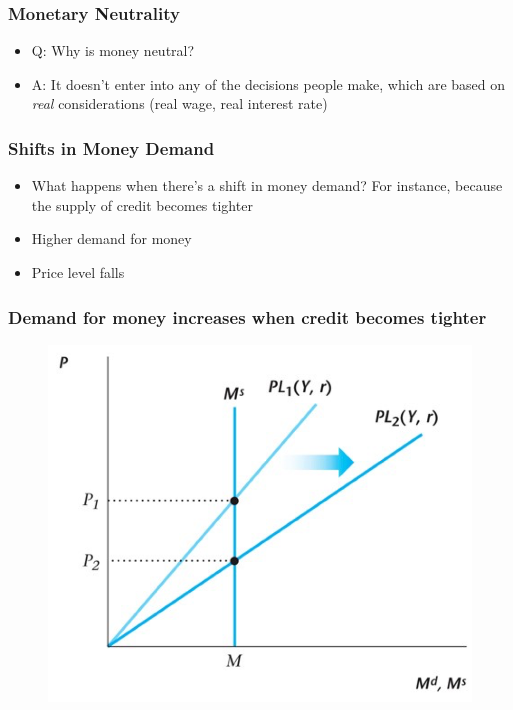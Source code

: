 \documentclass{beamer}
\begin{document}
\begin{frame}
\frametitle[alignment=center]{Monetary Neutrality}
\begin{itemize}
\item Q: Why is money neutral?
\bigskip
\item A: It doesn't enter into any of the decisions people make, which are based on \emph{real} considerations (real wage, real interest rate)
\end{itemize}
\end{frame}

\begin{frame}
\frametitle[alignment=center]{Shifts in Money Demand}
\begin{itemize}
\item What happens when there's a shift in money demand?  For instance, because the supply of credit becomes tighter
\bigskip
\item Higher demand for money
\bigskip
\item Price level falls
\end{itemize}
\end{frame}

\begin{frame}
\frametitle[alignment=center]{Demand for money increases when credit becomes tighter}
\begin{figure}
\centering
\includegraphics[scale=0.65]{Figures/W_Fig_12pt13.png}
\end{figure}
\end{frame}
\end{document}
